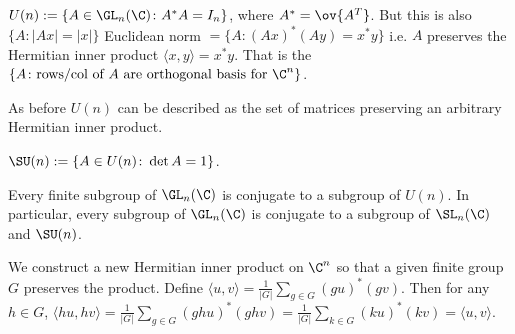 \begin{dfn}
$U(n):= \{A \in \GL_n(\C) \colon A^*A=I_n\}$, where $A^*=\ov{A^T}$. But this is also $\{A \colon |Ax|=|x|\}$ Euclidean norm $=\{ A \colon (Ax)^*(Ay)=x^*y\}$ i.e. $A$ preserves the Hermitian inner product $\langle x,y \rangle = x^*y$. That is the $\{A \colon \text{rows/col of }A \text{ are orthogonal basis for }\C^n\}$. 
\end{dfn}

As before $U(n)$ can be described as the set of matrices preserving an arbitrary Hermitian inner product. 

\begin{dfn}
$\SU(n):=\{A \in U(n) \colon \det A=1\}$. 
\end{dfn}


\begin{lem}
Every finite subgroup of $\GL_n(\C)$ is conjugate to a subgroup of $U(n)$. In particular, every subgroup of $\GL_n(\C)$ is conjugate to a subgroup of $\SL_n(\C)$ and $\SU(n)$. 
\end{lem}

\pf We construct a new Hermitian inner product on $\C^n$ so that a given finite group $G$ preserves the product. Define $\langle u,v \rangle= \frac{1}{|G|} \sum_{g \in G} (gu)^*(gv)$. Then for any $h \in G$, $\langle hu,hv \rangle= \frac{1}{|G|} \sum_{g \in G} (ghu)^*(ghv)= \frac{1}{|G|} \sum_{k \in G} (ku)^*(kv)=\langle u,v \rangle$. 






























